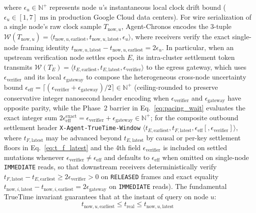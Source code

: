 \documentclass[conference,10pt]{IEEEtran}
\begin{document}
where $\epsilon_u \in \mathbb{N}^+$ represents node $u$'s instantaneous local clock drift bound ($\epsilon_u \in [1, 7]\text{ ms}$ in production Google Cloud data centers). For wire serialization of a single node's raw clock sample $T_{\text{now},u}$, Agent-Chronos encodes the 3-tuple $\mathcal{W}(T_{\text{now},u}) = \langle t_{\text{now},u,\text{earliest}}, t_{\text{now},u,\text{latest}}, \epsilon_u \rangle$, where receivers verify the exact single-node framing identity $t_{\text{now},u,\text{latest}} - t_{\text{now},u,\text{earliest}} = 2\epsilon_u$. In particular, when an upstream verification node settles epoch $E$, its intra-cluster settlement token transmits $\mathcal{W}(T_E) = \langle t_{E,\text{earliest}}, t_{E,\text{latest}}, \epsilon_{\text{verifier}} \rangle$ to the egress gateway, which uses $\epsilon_{\text{verifier}}$ and its local $\epsilon_{\text{gateway}}$ to compose the heterogeneous cross-node uncertainty bound $\epsilon_{\text{eff}} = \lceil (\epsilon_{\text{verifier}} + \epsilon_{\text{gateway}})/2 \rceil \in \mathbb{N}^+$ (ceiling-rounded to preserve conservative integer nanosecond header encoding when $\epsilon_{\text{verifier}}$ and $\epsilon_{\text{gateway}}$ have opposite parity, while the Phase~2 barrier in Eq.~\eqref{eq:pacing_wait} evaluates the exact integer sum $2\epsilon_{\text{eff}}^{\text{exact}} = \epsilon_{\text{verifier}} + \epsilon_{\text{gateway}} \in \mathbb{N}^+$; for the composite outbound settlement header \texttt{X-Agent-TrueTime-Window} $\langle t_{E,\text{earliest}}, t_{F,\text{latest}}, \epsilon_{\text{eff}}[, \epsilon_{\text{verifier}}] \rangle$, where $t_{F,\text{latest}}$ may be advanced beyond $t_{E,\text{latest}}$ by causal or per-key settlement floors in Eq.~\eqref{eq:t_f_latest} and the 4th field $\epsilon_{\text{verifier}}$ is included on settled mutations whenever $\epsilon_{\text{verifier}} \ne \epsilon_{\text{eff}}$ and defaults to $\epsilon_{\text{eff}}$ when omitted on single-node \texttt{IMMEDIATE} reads, so that downstream receivers deterministically verify $t_{F,\text{latest}} - t_{E,\text{earliest}} \ge 2\epsilon_{\text{verifier}} > 0$ on \texttt{RELEASED} frames and exact equality $t_{\text{now},i,\text{latest}} - t_{\text{now},i,\text{earliest}} = 2\epsilon_{\text{gateway}}$ on \texttt{IMMEDIATE} reads). The fundamental TrueTime invariant guarantees that at the instant of query on node $u$:
\begin{equation}
t_{\text{now},u,\text{earliest}} \le t_{\text{real}} \le t_{\text{now},u,\text{latest}}
\label{eq:truetime_invariant}
\end{equation}
\end{document}
